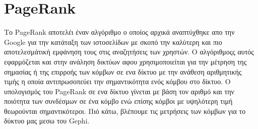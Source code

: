 \documentclass[12pt]{article}
\begin{document}
	
	\newpage
	\section{PageRank}
	\label{chap:PageRank_13}
	Το PageRank αποτελέι έναν αλγόριθμο ο οποίος αρχικά αναπτύχθηκε απο την Google για την κατάταξη των ιστοσελίδων με σκοπό την καλύτερη και πιο αποτελεσμάτική εμφάνηση τους στις αναζητήσεις των χρηστών. Ο αλγόριθμοςς αυτός εφαρμόζεται και στην ανάληση δικτύων  αφου χρησιμοποιείται για την μέτρηση της σημασίας ή της επιρροής των κόμβων σε ενα δίκτυο με την ανάθεση αριθμητικής τιμής η οποία αντιπρωσοπεύει την σημαντικότητα ενός κόμβου στο δίκτυο. Ο υπολογισμός του PageRank σε ενα δίκτυο γίνεται με βάση τον αριθμό και την ποιότητα των συνδέσμων σε ένα κόμβο ενώ επίσης κόμβοι με υψηλότερη τιμή θεωρούνται σημαντικότεροι. Πιό κάτω, βλέπουμε τις μετρήσεις των κόμβων για το δύκτυο μας μεσω του Gephi.
	
\end{document}
